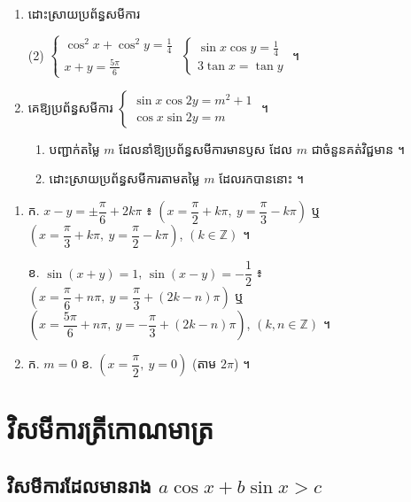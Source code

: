 \begin{pro}
\begin{enumerate}[1]
  \item ដោះស្រាយប្រព័ន្ធសមីការ
  \begin{tasks}(2)
    \task $\begin{cases} \cos^2 x + \cos^2 y = \frac{1}{4}\\ x + y = \frac{5\pi}{6} \end{cases}$
    \task $\begin{cases} \sin x\cos y = \frac{1}{4}\\ 3\tan x = \tan y \end{cases}$ ។
  \end{tasks}
  \item គេឱ្យប្រព័ន្ធសមីការ $\begin{cases} \sin x\cos 2y = m^2 + 1\\ \cos x\sin 2y = m \end{cases}$ ។
  \begin{enumerate}[a]
    \item បញ្ជាក់តម្លៃ $m$ ដែលនាំឱ្យប្រព័ន្ធសមីការមានឫស ដែល $m$ ជាចំនួនគត់វិជ្ជមាន ។
    \item ដោះស្រាយប្រព័ន្ធសមីការតាមតម្លៃ $m$ ដែលរកបាននោះ ។
  \end{enumerate}
\end{enumerate}
\ans
\begin{enumerate}[1]
  \item ក. $x - y = \pm\dfrac{\pi}{6} + 2k\pi$ ៖ $\left(x = \dfrac{\pi}{2} + k\pi, \ y = \dfrac{\pi}{3} - k\pi\right)$ ឬ $\left(x = \dfrac{\pi}{3} + k\pi, \ y = \dfrac{\pi}{2} - k\pi\right)$, $(k \in \mathbb{Z})$ ។

  ខ. $\sin(x + y) = 1$, $\sin(x - y) = -\dfrac{1}{2}$ ៖ $\left(x = \dfrac{\pi}{6} + n\pi, \ y = \dfrac{\pi}{3} + (2k - n)\pi\right)$ ឬ $\left(x = \dfrac{5\pi}{6} + n\pi, \ y = -\dfrac{\pi}{3} + (2k - n)\pi\right)$, $(k, n \in \mathbb{Z})$ ។
  \item ក. $m = 0$ \qquad ខ. $\left(x = \dfrac{\pi}{2}, \ y = 0\right)$ (តាម $2\pi$) ។
\end{enumerate}
\end{pro}

\section{វិសមីការត្រីកោណមាត្រ}

\subsection{វិសមីការដែលមានរាង \texorpdfstring{$a\cos x + b\sin x > c$}{a cos x + b sin x > c}}

